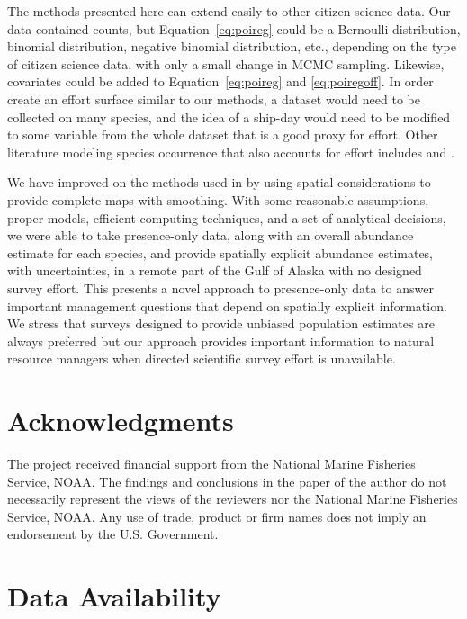\documentclass[11pt, titlepage]{article}
\begin{document}
\begin{spacing}{1.9}
\begin{flushleft}
The methods presented here can extend easily to other citizen science data.  Our data contained counts, but Equation~\eqref{eq:poireg} could be a Bernoulli distribution, binomial distribution, negative binomial distribution, etc., depending on the type of citizen science data, with only a small change in MCMC sampling.  Likewise, covariates could be added to Equation~\eqref{eq:poireg} and \eqref{eq:poiregoff}.  In order create an effort surface similar to our methods, a dataset would need to be collected on many species, and the idea of a ship-day would need to be modified to some variable from the whole dataset that is a good proxy for effort.  Other literature modeling species occurrence that also accounts for effort includes \citet{van_strien_opportunistic_2013} and \citet{dennis_efficient_2017}.

We have improved on the methods used in \citet{HimesBoorEtAl2012Stellersealion} by using spatial considerations to provide complete maps with smoothing. With some reasonable assumptions, proper models, efficient computing techniques, and a set of analytical decisions, we were able to take presence-only data, along with an overall abundance estimate for each species, and provide spatially explicit abundance estimates, with uncertainties, in a remote part of the Gulf of Alaska with no designed survey effort.  This presents a novel approach to presence-only data to answer important management questions that depend on spatially explicit information.  We stress that surveys designed to provide unbiased population estimates are always preferred but our approach provides important information to natural resource managers when directed scientific survey effort is unavailable.  
 
\section*{Acknowledgments}

The project received financial support from the National Marine Fisheries Service, NOAA. The findings and conclusions in the paper of the author do not necessarily represent the views of the reviewers nor the National Marine Fisheries Service, NOAA. Any use of trade, product or firm names does not imply an endorsement by the U.S. Government.

\section*{Data Availability}


\end{flushleft}
\end{spacing}
\end{document}

